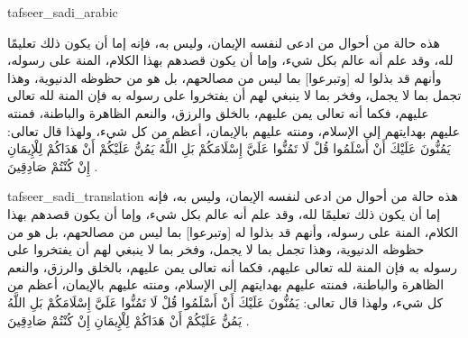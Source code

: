 \begin{taggedblock}{tafseer_sadi_arabic}
\begin{Arabic}
هذه حالة من أحوال من ادعى لنفسه الإيمان، وليس به، فإنه إما أن يكون ذلك تعليمًا لله، وقد علم أنه عالم بكل شيء، وإما أن يكون قصدهم بهذا الكلام، المنة على رسوله، وأنهم قد بذلوا له
[وتبرعوا]
بما ليس من مصالحهم، بل هو من حظوظه الدنيوية، وهذا تجمل بما لا يجمل، وفخر بما لا ينبغي لهم أن يفتخروا على رسوله به  فإن المنة لله تعالى عليهم، فكما أنه تعالى يمن  عليهم، بالخلق والرزق، والنعم الظاهرة والباطنة، فمنته عليهم بهدايتهم إلى الإسلام، ومنته عليهم بالإيمان، أعظم  من كل شيء، ولهذا قال تعالى:
{ يَمُنُّونَ عَلَيْكَ أَنْ أَسْلَمُوا قُلْ لَا تَمُنُّوا عَلَيَّ إِسْلَامَكُمْ بَلِ اللَّهُ يَمُنُّ عَلَيْكُمْ أَنْ هَدَاكُمْ لِلْإِيمَانِ إِنْ كُنْتُمْ صَادِقِينَ }
.
\end{Arabic}
\end{taggedblock}
\begin{taggedblock}{tafseer_sadi_translation}
هذه حالة من أحوال من ادعى لنفسه الإيمان، وليس به، فإنه إما أن يكون ذلك تعليمًا لله، وقد علم أنه عالم بكل شيء، وإما أن يكون قصدهم بهذا الكلام، المنة على رسوله، وأنهم قد بذلوا له
[وتبرعوا]
بما ليس من مصالحهم، بل هو من حظوظه الدنيوية، وهذا تجمل بما لا يجمل، وفخر بما لا ينبغي لهم أن يفتخروا على رسوله به  فإن المنة لله تعالى عليهم، فكما أنه تعالى يمن  عليهم، بالخلق والرزق، والنعم الظاهرة والباطنة، فمنته عليهم بهدايتهم إلى الإسلام، ومنته عليهم بالإيمان، أعظم  من كل شيء، ولهذا قال تعالى:
{ يَمُنُّونَ عَلَيْكَ أَنْ أَسْلَمُوا قُلْ لَا تَمُنُّوا عَلَيَّ إِسْلَامَكُمْ بَلِ اللَّهُ يَمُنُّ عَلَيْكُمْ أَنْ هَدَاكُمْ لِلْإِيمَانِ إِنْ كُنْتُمْ صَادِقِينَ }
.
\end{taggedblock}

\begin{comment}
Please use the following for footnotes:- Sample\footnoteQ{Text of Qur'an footnote goes here.}.
Sample\footnoteT{Text of Tafseer footnote goes here.}.
\end{comment}